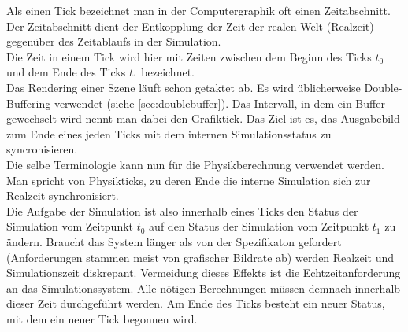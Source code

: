 
Als einen Tick bezeichnet man in der Computergraphik oft einen Zeitabschnitt. Der Zeitabschnitt dient der Entkopplung der Zeit der realen Welt (Realzeit) gegenüber des Zeitablaufs in der Simulation.\\
Die Zeit in einem Tick wird hier mit Zeiten zwischen dem Beginn des Ticks $t_0$ und dem Ende des Ticks $t_1$ bezeichnet.\\
Das Rendering einer Szene läuft schon getaktet ab. Es wird üblicherweise Double-Buffering verwendet (siehe \ref{sec:doublebuffer}). Das Intervall, in dem ein Buffer gewechselt wird nennt man dabei den Grafiktick. Das Ziel ist es, das Ausgabebild zum Ende eines jeden Ticks mit dem internen Simulationsstatus zu syncronisieren.\\
Die selbe Terminologie kann nun für die Physikberechnung verwendet werden. Man spricht von Physikticks, zu deren Ende die interne Simulation sich zur Realzeit synchronisiert.\\
Die Aufgabe der Simulation ist also innerhalb eines Ticks den Status der Simulation vom Zeitpunkt $t_0$ auf den Status der Simulation vom Zeitpunkt $t_1$ zu ändern. Braucht das System länger als von der Spezifikaton gefordert (Anforderungen stammen meist von grafischer Bildrate ab) werden Realzeit und Simulationszeit diskrepant. Vermeidung dieses Effekts ist die Echtzeitanforderung an das Simulationssystem.
Alle nötigen Berechnungen müssen demnach innerhalb dieser Zeit durchgeführt werden. Am Ende des Ticks besteht ein neuer Status, mit dem ein neuer Tick begonnen wird.\\

